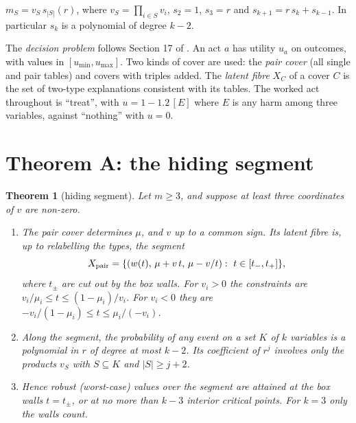 \documentclass[11pt]{article}
\newtheorem{theorem}{Theorem}\renewcommand{\thetheorem}{\Alph{theorem}}
\theoremstyle{definition}\newtheorem{definition}{Definition}\newtheorem{remark}{Remark}
\begin{document}
\begin{lemma}\label{lem:mom}
$m_S=v_S\,s_{|S|}(r)$, where $v_S=\prod_{i\in S}v_i$, $s_2=1$, $s_3=r$ and $s_{k+1}=r\,s_k+s_{k-1}$. In particular $s_k$ is a polynomial of
degree $k-2$.
\end{lemma}

The \emph{decision problem} follows Section 17 of \cite{PG}. An act $a$ has utility $u_a$ on outcomes, with values in
$[u_{\min},u_{\max}]$. Two kinds of cover are used: the \emph{pair cover} (all single and pair tables) and covers with triples added. The
\emph{latent fibre} $X_C$ of a cover $C$ is the set of two-type explanations consistent with its tables. The worked act throughout is
``treat'', with $u=1-1.2\,[E]$ where $E$ is any harm among three variables, against ``nothing'' with $u=0$.

\section{Theorem A: the hiding segment}\label{sec:A}
\begin{center}\end{center}

\begin{theorem}[hiding segment]\label{thm:A}
Let $m\ge3$, and suppose at least three coordinates of $v$ are non-zero.
\begin{enumerate}
\item[(a)] The pair cover determines $\mu$, and $v$ up to a common sign. Its latent fibre is, up to relabelling the types, the segment
\[X_{\rm pair}=\{(w(t),\,\mu+v\,t,\,\mu-v/t):\ t\in[t_-,t_+]\},\]
where $t_\pm$ are cut out by the box walls. For $v_i>0$ the constraints are $v_i/\mu_i\le t\le(1-\mu_i)/v_i$. For $v_i<0$ they are
$-v_i/(1-\mu_i)\le t\le\mu_i/(-v_i)$.
\item[(b)] Along the segment, the probability of any event on a set $K$ of $k$ variables is a polynomial in $r$ of degree at most $k-2$.
Its coefficient of $r^j$ involves only the products $v_S$ with $S\subseteq K$ and $|S|\ge j+2$.
\item[(c)] Hence robust (worst-case) values over the segment are attained at the box walls $t=t_\pm$, or at no more than $k-3$ interior
critical points. For $k=3$ only the walls count.
\end{enumerate}
\end{theorem}
\end{document}
